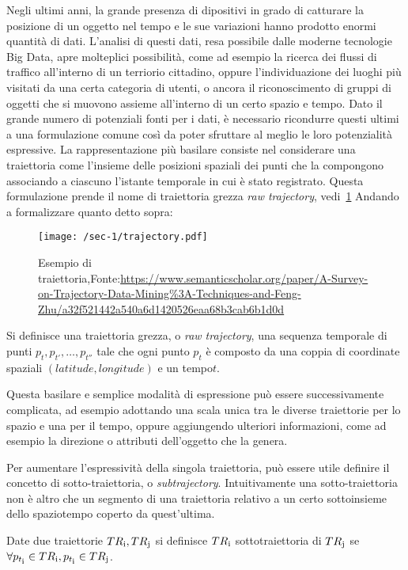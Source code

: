 Negli ultimi anni, la grande presenza di dipositivi in grado di catturare la posizione di un oggetto nel
tempo e le sue variazioni hanno prodotto enormi quantità di dati.
L'analisi di questi dati, resa possibile dalle moderne tecnologie Big Data, apre molteplici possibilità, come
ad esempio la ricerca dei flussi di traffico all'interno di un terriorio cittadino, oppure l'individuazione
dei luoghi più visitati da una certa categoria di utenti, o ancora il riconoscimento di gruppi di oggetti che si
muovono assieme all'interno di un certo spazio e tempo.
Dato il grande numero di potenziali fonti per i dati, è necessario ricondurre questi ultimi a una formulazione comune
così da poter sfruttare al meglio le loro potenzialità espressive.
La rappresentazione più basilare consiste nel considerare una traiettoria come l'insieme delle posizioni
spaziali dei punti che la compongono associando a ciascuno l'istante temporale in cui è stato registrato.
Questa formulazione prende il nome di traiettoria grezza \textit{raw trajectory}, vedi~\cref{fig:chap-1:trajectory}
Andando a formalizzare quanto detto sopra:

\begin{figure}
  \centering
  \texttt{[image: /sec-1/trajectory.pdf]}
  \caption{Esempio di traiettoria,Fonte:\url{https://www.semanticscholar.org/paper/A-Survey-on-Trajectory-Data-Mining\%3A-Techniques-and-Feng-Zhu/a32f521442a540a6d1420526eaa68b3cab6b1d0d}}%
  \label{fig:chap-1:trajectory}
\end{figure}

\begin{definition}[Traiettoria]

  Si definisce una traiettoria grezza, o \textit{raw trajectory}, una sequenza temporale di punti \({p_{t}, p_{t'},\ldots, p_{t''}}\)
  tale che ogni punto \(p_{t}\) è composto da una coppia di coordinate spaziali \((latitude, longitude)\) e un tempo\(t\).

\end{definition}

Questa basilare e semplice modalità di espressione può essere successivamente complicata, ad esempio adottando
una scala unica tra le diverse traiettorie per lo spazio e una per il tempo, oppure aggiungendo ulteriori informazioni, come ad esempio la direzione o attributi
dell'oggetto che la genera.

Per aumentare l'espressività della singola traiettoria, può essere utile definire il concetto di sotto-traiettoria, o \textit{subtrajectory}.
Intuitivamente una sotto-traiettoria non è altro che un segmento di una traiettoria relativo a un certo sottoinsieme dello spaziotempo coperto da quest'ultima.

\begin{definition}[Sottotraiettoria]

  Date due traiettorie \(TR\textsubscript{i}, TR\textsubscript{j}\) si definisce  \(TR\textsubscript{i}\) sottotraiettoria di \(TR\textsubscript{j}\) se \(\forall p_{t\textsubscript{i}} \in TR\textsubscript{i}, p_{t\textsubscript{i}} \in TR\textsubscript{j}\).

\end{definition}


